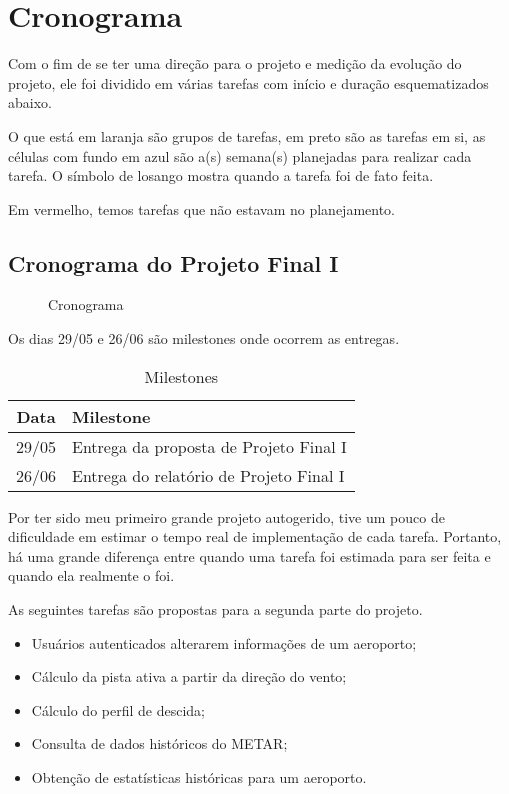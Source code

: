 \chapter{Cronograma}

Com o fim de se ter uma direção para o projeto e medição da evolução do projeto, ele foi dividido 
em várias tarefas com início e duração esquematizados abaixo.

O que está em laranja são grupos de tarefas, em preto são as tarefas em si, as células com fundo 
em azul são a(s) semana(s) planejadas para realizar cada tarefa. O símbolo de losango mostra 
quando a tarefa foi de fato feita.

Em vermelho, temos tarefas que não estavam no planejamento.

\section{Cronograma do Projeto Final I}

\begin{figure}[ht]
    \begin{center}
    
    \caption{Cronograma}
    \label{fig:cronograma-planejado}
    \end{center}
\end{figure}

Os dias 29/05 e 26/06 são milestones onde ocorrem as entregas.

\begin{table}[h]
    \centering
    \caption{Milestones}
    \begin{tabular}{|c|l|}
        \hline
        \textbf{Data} & \textbf{Milestone} \\
        \hline
        29/05 & Entrega da proposta de Projeto Final I \\
        26/06 & Entrega do relatório de Projeto Final I \\
        \hline
    \end{tabular}
\end{table}

Por ter sido meu primeiro grande projeto autogerido, tive um pouco de dificuldade em estimar o tempo real 
de implementação de cada tarefa. Portanto, há uma grande diferença entre quando uma tarefa foi estimada 
para ser feita e quando ela realmente o foi.

As seguintes tarefas são propostas para a segunda parte do projeto.

\begin{itemize}
    \item Usuários autenticados alterarem informações de um aeroporto;
    \item Cálculo da pista ativa a partir da direção do vento;
    \item Cálculo do perfil de descida;
    \item Consulta de dados históricos do METAR;
    \item Obtenção de estatísticas históricas para um aeroporto.
\end{itemize}

